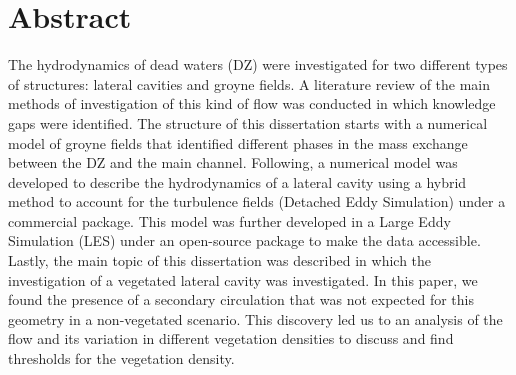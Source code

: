 \chapter*{Abstract}
The hydrodynamics of dead waters (DZ) were investigated for two different types of structures: lateral cavities and groyne fields. A literature review of the main methods of investigation of this kind of flow was conducted in which knowledge gaps were identified. The structure of this dissertation starts with a numerical model of groyne fields that identified different phases in the mass exchange between the DZ and the main channel. Following, a numerical model was developed to describe the hydrodynamics of a lateral cavity using a hybrid method to account for the turbulence fields (Detached Eddy Simulation) under a commercial package. This model was further developed in a Large Eddy Simulation (LES) under an open-source package to make the data accessible. Lastly, the main topic of this dissertation was described in which the investigation of a vegetated lateral cavity was investigated. In this paper, we found the presence of a secondary circulation that was not expected for this geometry in a non-vegetated scenario. This discovery led us to an analysis of the flow and its variation in different vegetation densities to discuss and find thresholds for the vegetation density.